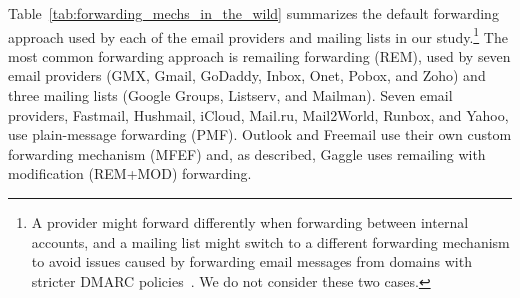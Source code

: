 

Table~\ref{tab:forwarding_mechs_in_the_wild} summarizes the default forwarding approach used by each of the email providers and mailing lists in our study.\footnote{A provider might forward differently when forwarding between internal accounts, and a mailing list might switch to a different forwarding mechanism to avoid issues caused by forwarding email messages from domains with stricter DMARC policies~\cite{spamreso59:online}. We do not consider these two cases.}
%
%
The most common forwarding approach is remailing forwarding (REM),
used by seven email providers (GMX, Gmail, GoDaddy, Inbox, Onet, Pobox, and Zoho) and
three mailing lists (Google Groups, Listserv, and Mailman). Seven email providers, Fastmail, Hushmail, iCloud, Mail.ru, Mail2World, Runbox, and Yahoo, use
plain-message forwarding (PMF).
Outlook and Freemail use their own custom
forwarding mechanism (MFEF) and, as described, Gaggle uses remailing with modification (REM+MOD)
forwarding.
